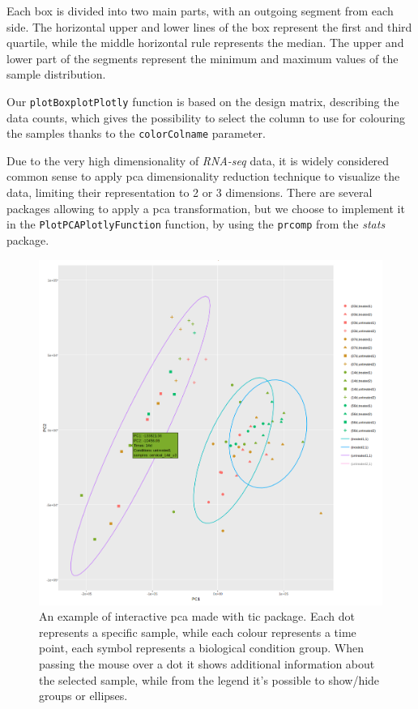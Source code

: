 Each box is divided into two main parts, with an outgoing segment from each side. 
The horizontal upper and lower lines of the box represent the first and third quartile, while the middle horizontal rule represents the median.
The upper and lower part of the segments represent the minimum and maximum values of the sample distribution.

Our \lstinline!plotBoxplotPlotly! function is based on the design matrix, describing the data counts, which gives the possibility to select the column to use for colouring the samples thanks to the \lstinline!colorColname! parameter. 

Due to the very high dimensionality of \textit{RNA-seq} data, it is widely considered common sense to apply \gls{pca} dimensionality reduction technique to visualize the data, limiting their representation to 2 or 3 dimensions.
There are several packages allowing to apply a \gls{pca} transformation, but we choose to implement it in the \lstinline!PlotPCAPlotlyFunction! function, by using the \lstinline!prcomp! from the \textit{stats} package.


\begin{figure}[H]
\centering
\includegraphics[width=\textwidth, keepaspectratio]{img/ticorser/pca_example.png}
\caption[ticorser pca]{An example of interactive \gls{pca} made with \gls{tic} package. Each dot represents a specific sample, while each colour represents a time point, each symbol represents a biological condition group. When passing the mouse over a dot it shows additional information about the selected sample, while from the legend it's possible to show/hide groups or ellipses.}
\label{fig:ticorserpca}

\end{figure}


